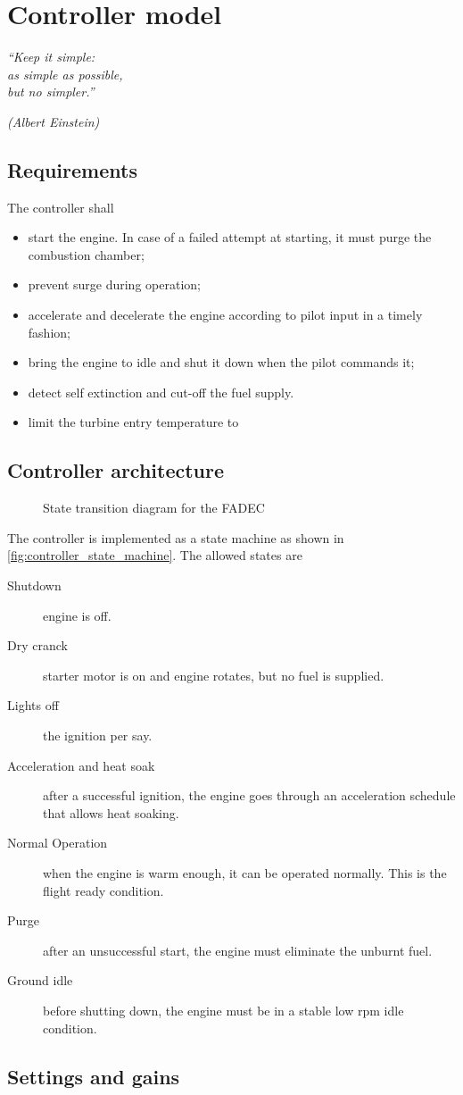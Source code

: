 \documentclass[tcc]{subfiles}
\begin{document}
\chapter{Controller model}
\label{ch:control}
\epigraph{\em ``Keep it simple:\\
as simple as possible,\\
but no simpler.''}{\em (Albert Einstein)}

\section{Requirements}
The controller shall
\begin{itemize}
    \item start the engine.
          In case of a failed attempt at starting, it must purge the combustion chamber;
    \item prevent surge during operation;
    \item accelerate and decelerate the engine according to pilot input in a timely fashion;
    \item bring the engine to idle and shut it down when the pilot commands it;
    \item detect self extinction and cut-off the fuel supply.
    \item limit the turbine entry temperature to 
\end{itemize}

\section{Controller architecture}
\begin{figure}[tp]
    \centering
    \caption{State transition diagram for the \acs{FADEC}}
    
    
    \source{\authorsfigure}
    \label{fig:controller_state_machine}
\end{figure}
The controller is implemented as a state machine \cite{amd_state_machine} 
 as shown in \autoref{fig:controller_state_machine}. 
The allowed states are
\begin{description}
    \item[Shutdown] engine is off. 
    \item[Dry cranck] starter motor is on and engine rotates,
          but no fuel is supplied.
    \item[Lights off] the ignition per say. 
    \item[Acceleration and heat soak] after a successful ignition,
          the engine goes through an acceleration schedule that allows heat soaking. 
    \item[Normal Operation] when the engine is warm enough, it can be operated normally.
          This is the flight ready condition.
    \item[Purge] after an unsuccessful start, the engine must eliminate the unburnt fuel. 
    \item[Ground idle] before shutting down, the engine must be in a stable low rpm idle condition.
\end{description}


\section{Settings and gains}
\end{document}
